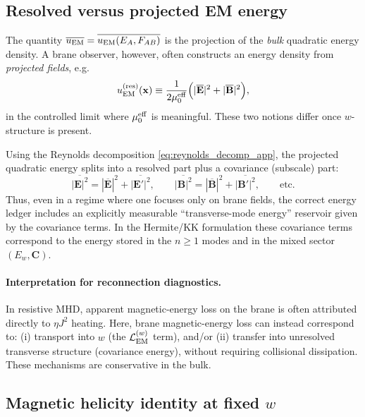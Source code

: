 \documentclass[11pt]{article}
\begin{document}
\subsection{Resolved versus projected EM energy}
\label{app:resolved_vs_projected_energy}

The quantity \(\overline{u_{\rm EM}}=\overline{u_{\rm EM}(E_A,F_{AB})}\) is the
projection of the \emph{bulk} quadratic energy density. A brane observer, however,
often constructs an energy density from \emph{projected fields}, e.g.
\begin{equation}
u_{\rm EM}^{\rm (res)}(\mathbf{x})
\equiv
\frac{1}{2\mu_0^{\rm eff}}
\Big(
|\overline{\mathbf{E}}|^2 + |\overline{\mathbf{B}}|^2
\Big),
\label{eq:resolved_energy_def_app}
\end{equation}
in the controlled limit where \(\mu_0^{\rm eff}\) is meaningful. These two notions differ
once \(w\)-structure is present.

Using the Reynolds decomposition \eqref{eq:reynolds_decomp_app}, the projected quadratic energy
splits into a resolved part plus a covariance (subscale) part:
\begin{equation}
\overline{|\mathbf{E}|^2}
=
|\overline{\mathbf{E}}|^2 + \overline{|\mathbf{E}'|^2},
\qquad
\overline{|\mathbf{B}|^2}
=
|\overline{\mathbf{B}}|^2 + \overline{|\mathbf{B}'|^2},
\qquad\text{etc.}
\label{eq:energy_reynolds_split_app}
\end{equation}
Thus, even in a regime where one focuses only on brane fields, the correct energy ledger
includes an explicitly measurable ``transverse-mode energy'' reservoir given by the covariance
terms. In the Hermite/KK formulation these covariance terms correspond to the energy stored in
the \(n\ge 1\) modes and in the mixed sector \((E_w,\mathbf{C})\).

\paragraph{Interpretation for reconnection diagnostics.}
In resistive MHD, apparent magnetic-energy loss on the brane is often attributed directly to
\(\eta J^2\) heating. Here, brane magnetic-energy loss can instead correspond to:
(i) transport into \(w\) (the \(\mathcal{L}_{\rm EM}^{(w)}\) term), and/or
(ii) transfer into unresolved transverse structure (covariance energy),
without requiring collisional dissipation. These mechanisms are conservative in the bulk.

\subsection{Magnetic helicity identity at fixed \(w\)}
\label{app:helicity_identity}
\end{document}
